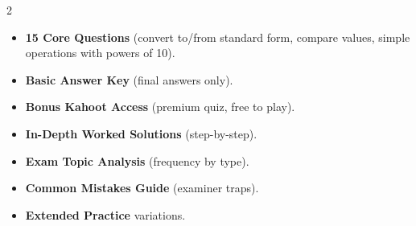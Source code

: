 \documentclass[11pt,a4paper]{article}
\newcommand{\FullReleaseDate}{April 30, 2026}
\begin{document}
\vspace{8pt}

\begin{multicols}{2}
  \begin{tcolorbox}[card, title=\sffamily\bfseries\textcolor{white}{\faHandPointDown\ TODAY (Simplified Version)}, colbacktitle=mainblue, boxed title style={sharp corners, boxrule=0pt}]
    \begin{itemize}[leftmargin=1.2em, itemsep=2pt]
      \item \small \textbf{15 Core Questions} (convert to/from standard form, compare values, simple operations with powers of 10).
      \item \small \textbf{Basic Answer Key} (final answers only).
      \item \small \textbf{Bonus Kahoot Access} (premium quiz, free to play).
    \end{itemize}
  \end{tcolorbox}

  \columnbreak

  \begin{tcolorbox}[card, title=\sffamily\bfseries\textcolor{white}{\faRocket\ ON \FullReleaseDate\ (Full Upgrade)}, colbacktitle=mainblue, boxed title style={sharp corners, boxrule=0pt}]
    \begin{itemize}[leftmargin=1.2em, itemsep=2pt]
      \item \small \textbf{In-Depth Worked Solutions} (step-by-step).
      \item \small \textbf{Exam Topic Analysis} (frequency by type).
      \item \small \textbf{Common Mistakes Guide} (examiner traps).
      \item \small \textbf{Extended Practice} variations.
    \end{itemize}
  \end{tcolorbox}
\end{multicols}
\end{document}
